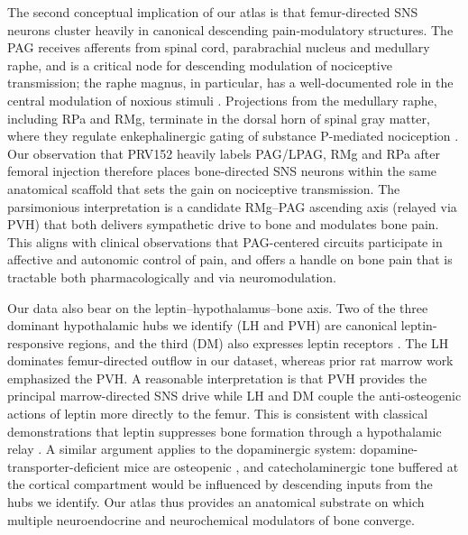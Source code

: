 \documentclass[11pt]{article}
\begin{document}
The second conceptual implication of our atlas is that femur-directed SNS neurons cluster heavily in canonical descending pain-modulatory structures. The PAG receives afferents from spinal cord, parabrachial nucleus and medullary raphe, and is a critical node for descending modulation of nociceptive transmission; the raphe magnus, in particular, has a well-documented role in the central modulation of noxious stimuli \citep{francois2017brainstem,heinricher2009descending,benarroch2012postural}. Projections from the medullary raphe, including RPa and RMg, terminate in the dorsal horn of spinal gray matter, where they regulate enkephalinergic gating of substance P-mediated nociception \citep{francois2017brainstem}. Our observation that PRV152 heavily labels PAG/LPAG, RMg and RPa after femoral injection therefore places bone-directed SNS neurons within the same anatomical scaffold that sets the gain on nociceptive transmission. The parsimonious interpretation is a candidate RMg--PAG ascending axis (relayed via PVH) that both delivers sympathetic drive to bone and modulates bone pain. This aligns with clinical observations that PAG-centered circuits participate in affective and autonomic control of pain, and offers a handle on bone pain that is tractable both pharmacologically and via neuromodulation.

Our data also bear on the leptin--hypothalamus--bone axis. Two of the three dominant hypothalamic hubs we identify (LH and PVH) are canonical leptin-responsive regions, and the third (DM) also expresses leptin receptors \citep{flak2016cns}. The LH dominates femur-directed outflow in our dataset, whereas prior rat marrow work emphasized the PVH. A reasonable interpretation is that PVH provides the principal marrow-directed SNS drive while LH and DM couple the anti-osteogenic actions of leptin more directly to the femur. This is consistent with classical demonstrations that leptin suppresses bone formation through a hypothalamic relay \citep{ducy2000leptin,takeda2002leptin}. A similar argument applies to the dopaminergic system: dopamine-transporter-deficient mice are osteopenic \citep{bliziotes2000bone}, and catecholaminergic tone buffered at the cortical compartment \citep{zhu2018cortical} would be influenced by descending inputs from the hubs we identify. Our atlas thus provides an anatomical substrate on which multiple neuroendocrine and neurochemical modulators of bone converge.
\end{document}
